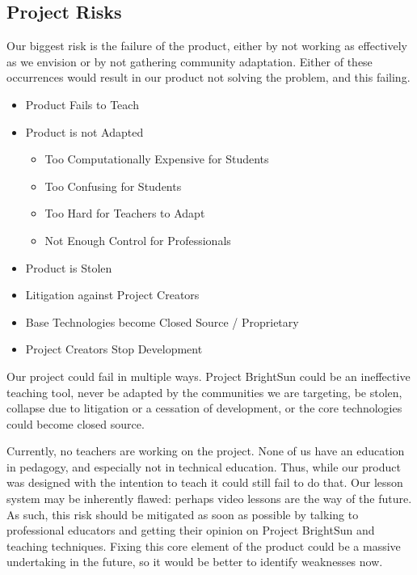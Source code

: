 \documentclass[openright]{report}
\begin{document}
\subsection{Project Risks}

\par Our biggest risk is the failure of the product, either by not working as effectively as we envision or by not gathering community adaptation. Either of these occurrences would result in our product not solving the problem, and this failing.

\begin{itemize}
    \item Product Fails to Teach
    \item Product is not Adapted
        \begin{itemize}
            \item Too Computationally Expensive for Students
            \item Too Confusing for Students
            \item Too Hard for Teachers to Adapt
            \item Not Enough Control for Professionals
        \end{itemize}
    \item Product is Stolen
    \item Litigation against Project Creators
    \item Base Technologies become Closed Source / Proprietary
    \item Project Creators Stop Development
\end{itemize}

\par Our project could fail in multiple ways. Project BrightSun could be an ineffective teaching tool, never be adapted by the communities we are targeting, be stolen, collapse due to litigation or a cessation of development, or the core technologies could become closed source.

\par Currently, no teachers are working on the project. None of us have an education in pedagogy, and especially not in technical education. Thus, while our product was designed with the intention to teach it could still fail to do that. Our lesson system may be inherently flawed: perhaps video lessons are the way of the future. As such, this risk should be mitigated as soon as possible by talking to professional educators and getting their opinion on Project BrightSun and teaching techniques. Fixing this core element of the product could be a massive undertaking in the future, so it would be better to identify weaknesses now. 
\end{document}
